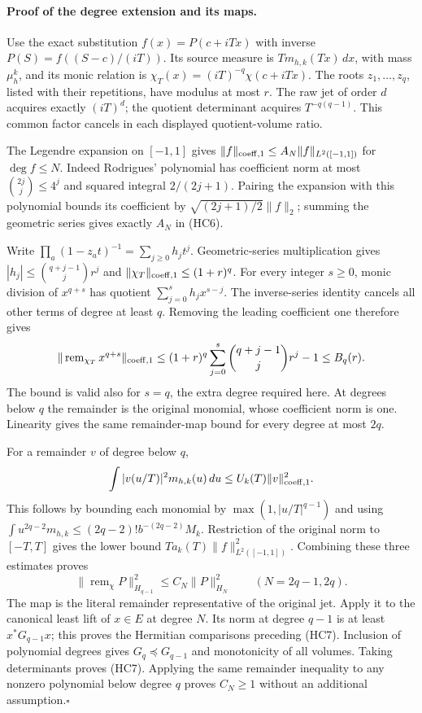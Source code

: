 \paragraph{Proof of the degree extension and its maps.}
Use the exact substitution $f(x)=P(c+iTx)$ with inverse
$P(S)=f((S-c)/(iT))$.  Its source measure is $T m_{h,k}(Tx)\,dx$,
with mass $\mu_h^k$, and its monic relation is
$\chi_T(x)=(iT)^{-q}\chi(c+iTx)$.  The roots $z_1,\ldots,z_q$,
listed with their repetitions, have modulus at most $r$.
The raw jet of order $d$ acquires exactly $(iT)^d$; the quotient
determinant acquires $T^{-q(q-1)}$.  This common factor cancels in
each displayed quotient-volume ratio.

The Legendre expansion on $[-1,1]$ gives
$\|f\|_{{\rm coeff},1}\leq A_N\|f\|_{L^2([-1,1])}$ for
$\deg f\leq N$.  Indeed Rodrigues' polynomial has coefficient norm
at most $\binom{2j}{j}\leq4^j$ and squared integral $2/(2j+1)$.
Pairing the expansion with this polynomial bounds its coefficient by
$\sqrt{(2j+1)/2}\|f\|_2$; summing the geometric series gives exactly
$A_N$ in (HC6).

Write $\prod_a(1-z_at)^{-1}=\sum_{j\geq0}h_jt^j$.
Geometric-series multiplication gives
$|h_j|\leq\binom{q+j-1}{j}r^j$ and
$\|\chi_T\|_{{\rm coeff},1}\leq(1+r)^q$.
For every integer $s\geq0$, monic division of $x^{q+s}$ has quotient
$\sum_{j=0}^sh_jx^{s-j}$.  The inverse-series identity cancels all
other terms of degree at least $q$.  Removing the leading coefficient
one therefore gives
\[
 \|\operatorname{rem}_{\chi_T}x^{q+s}\|_{{\rm coeff},1}
 \leq(1+r)^q\sum_{j=0}^s\binom{q+j-1}{j}r^j-1
 \leq B_q(r).
\]
The bound is valid also for $s=q$, the extra degree required here.
At degrees below $q$ the remainder is the original monomial, whose
coefficient norm is one.  Linearity gives the same remainder-map
bound for every degree at most $2q$.

For a remainder $v$ of degree below $q$,
\[
 \int |v(u/T)|^2m_{h,k}(u)\,du
 \leq U_k(T)\|v\|_{{\rm coeff},1}^{2}.
\]
This follows by bounding each monomial by
$\max(1,|u/T|^{q-1})$ and using
$\int u^{2q-2}m_{h,k}\leq(2q-2)!b^{-(2q-2)}M_k$.
Restriction of the original norm to $[-T,T]$ gives the lower bound
$T a_k(T)\|f\|_{L^2([-1,1])}^2$.  Combining these three estimates proves
\[
 \|\operatorname{rem}_{\chi}P\|_{H_{q-1}}^2
 \leq C_N\|P\|_{H_N}^2\qquad(N=2q-1,2q).
\]
The map is the literal remainder representative of the original jet.
Apply it to the canonical least lift of $x\in E$ at degree $N$.
Its norm at degree $q-1$ is at least $x^*G_{q-1}x$; this proves the
Hermitian comparisons preceding (HC7).  Inclusion of polynomial degrees
gives $G_q\preceq G_{q-1}$ and monotonicity of all volumes.  Taking
determinants proves (HC7).  Applying the same remainder inequality to
any nonzero polynomial below degree $q$ proves $C_N\geq1$ without an
additional assumption.\hfill$\square$

